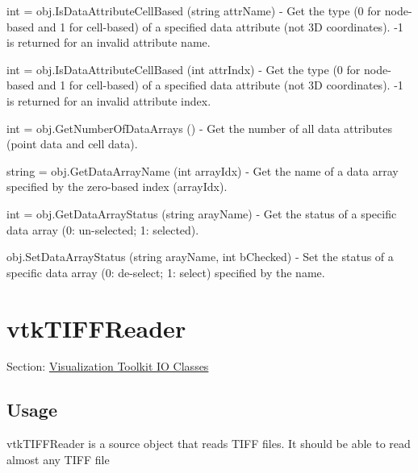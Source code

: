 \begin{DoxyItemize}
\item {\ttfamily int = obj.\-Is\-Data\-Attribute\-Cell\-Based (string attr\-Name)} -\/ Get the type (0 for node-\/based and 1 for cell-\/based) of a specified data attribute (not 3\-D coordinates). -\/1 is returned for an invalid attribute name.  
\item {\ttfamily int = obj.\-Is\-Data\-Attribute\-Cell\-Based (int attr\-Indx)} -\/ Get the type (0 for node-\/based and 1 for cell-\/based) of a specified data attribute (not 3\-D coordinates). -\/1 is returned for an invalid attribute index.  
\item {\ttfamily int = obj.\-Get\-Number\-Of\-Data\-Arrays ()} -\/ Get the number of all data attributes (point data and cell data).  
\item {\ttfamily string = obj.\-Get\-Data\-Array\-Name (int array\-Idx)} -\/ Get the name of a data array specified by the zero-\/based index (array\-Idx).  
\item {\ttfamily int = obj.\-Get\-Data\-Array\-Status (string aray\-Name)} -\/ Get the status of a specific data array (0\-: un-\/selected; 1\-: selected).  
\item {\ttfamily obj.\-Set\-Data\-Array\-Status (string aray\-Name, int b\-Checked)} -\/ Set the status of a specific data array (0\-: de-\/select; 1\-: select) specified by the name.  
\end{DoxyItemize}\hypertarget{vtkio_vtktiffreader}{}\section{vtk\-T\-I\-F\-F\-Reader}\label{vtkio_vtktiffreader}
Section\-: \hyperlink{sec_vtkio}{Visualization Toolkit I\-O Classes} \hypertarget{vtkwidgets_vtkxyplotwidget_Usage}{}\subsection{Usage}\label{vtkwidgets_vtkxyplotwidget_Usage}
vtk\-T\-I\-F\-F\-Reader is a source object that reads T\-I\-F\-F files. It should be able to read almost any T\-I\-F\-F file

